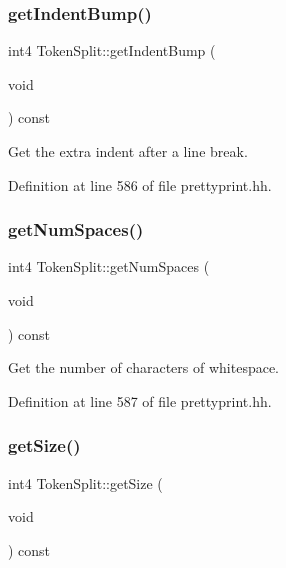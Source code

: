 \subsubsection{\texorpdfstring{getIndentBump()}{getIndentBump()}}
{\footnotesize\ttfamily int4 Token\+Split\+::get\+Indent\+Bump (\begin{DoxyParamCaption}\item[{void}]{ }\end{DoxyParamCaption}) const\hspace{0.3cm}{\ttfamily [inline]}}



Get the extra indent after a line break. 



Definition at line 586 of file prettyprint.\+hh.

\mbox{\label{class_token_split_ae25bbe93a73752c9d36d9bbb985f2499}} 
\subsubsection{\texorpdfstring{getNumSpaces()}{getNumSpaces()}}
{\footnotesize\ttfamily int4 Token\+Split\+::get\+Num\+Spaces (\begin{DoxyParamCaption}\item[{void}]{ }\end{DoxyParamCaption}) const\hspace{0.3cm}{\ttfamily [inline]}}



Get the number of characters of whitespace. 



Definition at line 587 of file prettyprint.\+hh.

\mbox{\label{class_token_split_acf9542eb5fe9653255b5277cc63c1e6a}} 
\subsubsection{\texorpdfstring{getSize()}{getSize()}}
{\footnotesize\ttfamily int4 Token\+Split\+::get\+Size (\begin{DoxyParamCaption}\item[{void}]{ }\end{DoxyParamCaption}) const\hspace{0.3cm}{\ttfamily [inline]}}



